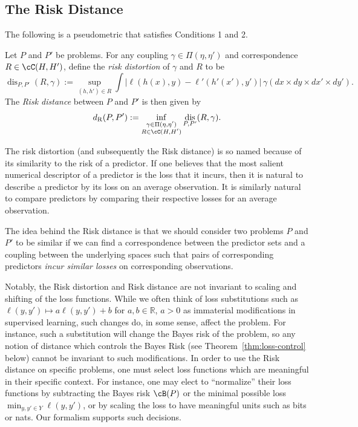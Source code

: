 \documentclass[twoside,11pt]{article}
\newcommand{\dexp}[1][]{d_{\mathrm{R}#1}}
\DeclareMathOperator{\dis}{dis}
\begin{document}
\subsection{The Risk Distance}

The following is a pseudometric that satisfies Conditions 1 and 2.
\begin{definition}\label{def:metric}
    Let $P$ and $P'$ be problems. For any coupling $\gamma \in \Pi(\eta,\eta')$ and correspondence $R\in \cC(H,H')$, define the \emph{risk distortion} of $\gamma$ and $R$ to be
    \[\dis_{P,P'}(R,\gamma):= \sup_{(h,h')\in R}
    \int \big|\ell(h(x),y) - \ell'(h'(x'),y')\big|
    \, \gamma(dx{\times} dy {\times} dx' {\times} dy').\]
    The \emph{Risk distance} between $P$ and $P'$ is then given by
    \[\dexp (P, P'):=\inf_{\substack{\gamma\in \Pi(\eta,\eta')\\R\in \cC(H,H')}} \dis_{P,P'}(R,\gamma).\]
\end{definition}

The risk distortion (and subsequently the Risk distance) is so named because of its similarity to the risk of a predictor.
If one believes that the most salient numerical descriptor of a predictor is the loss that it incurs, then it is natural to describe a predictor by its loss on an average observation. It is similarly natural to compare predictors by comparing their respective losses for an average observation.

The idea behind the Risk distance is that we should consider two problems $P$ and $P'$ to be similar if we can find a correspondence between the predictor sets and a coupling between the underlying spaces such that pairs of corresponding predictors \emph{incur similar losses} on corresponding observations.

Notably, the Risk distortion and Risk distance are not invariant to scaling and shifting of the loss functions. While we often think of loss substitutions such as $\ell(y,y')\mapsto a\ell(y,y') + b$ for $a,b\in \mathbb R$, $a>0$ as immaterial modifications in supervised learning, such changes do, in some sense, affect the problem. For instance, such a substitution will change the Bayes risk of the problem, so any notion of distance which controls the Bayes Risk (see Theorem~\ref{thm:loss-control} below) cannot be invariant to such modifications. In order to use the Risk distance on specific problems, one must select loss functions which are meaningful in their specific context. For instance, one may elect to ``normalize'' their loss functions by subtracting the Bayes risk $\cB(P)$ or the minimal possible loss $\min_{y,y'\in Y}\ell(y,y')$, or by scaling the loss to have meaningful units such as bits or nats. Our formalism supports such decisions.
\end{document}
